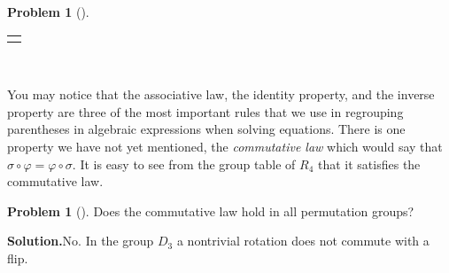 \documentclass[10pt,]{book}
\theoremstyle{plain}
\theoremstyle{definition}
\newtheorem{activity}[project]{Problem}
\theoremstyle{definition}
\numberwithin{equation}{chapter}
\newlength{\panelmax}
\begin{document}
\begin{activity}[]
{\settototalheight{\phMtabular}{\usebox{\panelboxMtabular}}
\setlength{\panelmax}{\maxof{\panelmax}{\phMtabular}}
\leavevmode%
\setlength{\tabcolsep}{0\linewidth}
\par\medskip\noindent
\begin{tabular}{@{}*{1}{c}@{}}
\begin{minipage}[c][\panelmax][t]{1\linewidth}\usebox{\panelboxMtabular}\end{minipage}\end{tabular}\\
}%
\end{activity}
You may notice that the associative law, the identity property, and the inverse property are three of the most important rules that we use in regrouping parentheses in algebraic expressions when solving equations. There is one property we have not yet mentioned, the \emph{commutative law} which would say that \(\sigma\circ \varphi =
\varphi\circ\sigma\). It is easy to see from the group table of \(R_4\) that it satisfies the commutative law.%
\begin{activity}[]\label{activity-269}
Does the commutative law hold in all permutation groups?%
\par\medskip\noindent%
\textbf{Solution.}\quad No. In the group \(D_3\) a nontrivial rotation does not commute with a flip.%
\end{activity}
\typeout{************************************************}
\typeout{************************************************}
\end{document}
